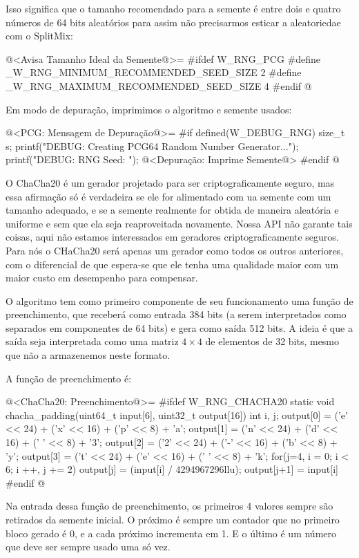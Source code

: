Isso significa que o tamanho recomendado para a semente é entre dois e
quatro números de 64 bits aleatórios para assim não precisarmos
esticar a aleatoriedae com o SplitMix:

\iniciocodigo
@<Avisa Tamanho Ideal da Semente@>=
#ifdef W_RNG_PCG
#define _W_RNG_MINIMUM_RECOMMENDED_SEED_SIZE  2
#define _W_RNG_MAXIMUM_RECOMMENDED_SEED_SIZE  4
#endif
@
\fimcodigo

Em modo de depuração, imprimimos o algoritmo e semente usados:

\iniciocodigo
@<PCG: Mensagem de Depuração@>=
#if defined(W_DEBUG_RNG)
{
  size_t s;
  printf("DEBUG: Creating PCG64 Random Number Generator...");
  printf("DEBUG: RNG Seed: ");
  @<Depuração: Imprime Semente@>
}
#endif
@
\fimcodigo



O ChaCha20 é um gerador projetado para ser criptograficamente seguro,
mas essa afirmação só é verdadeira se ele for alimentado com ua
semente com um tamanho adequado, e se a semente realmente for obtida
de maneira aleatória e uniforme e sem que ela seja reaproveitada
novamente. Nossa API não garante tais coisas, aqui não estamos
interessados em geradores criptograficamente seguros. Para nós o
CHaCha20 será apenas um gerador como todos os outros anteriores, com o
diferencial de que espera-se que ele tenha uma qualidade maior com um
maior custo em desempenho para compensar.

O algoritmo tem como primeiro componente de seu funcionamento uma
função de preenchimento, que receberá como entrada 384 bits (a serem
interpretados como separados em componentes de 64 bits) e gera como
saída 512 bits. A ideia é que a saída seja interpretada como uma
matriz $4\times 4$ de elementos de 32 bits, mesmo que não a
armazenemos neste formato.

A função de preenchimento é:

\iniciocodigo
@<ChaCha20: Preenchimento@>=
#ifdef W_RNG_CHACHA20
static void chacha_padding(uint64_t input[6], uint32_t output[16]){
  int i, j;
  output[0] = ('e' << 24) + ('x' << 16) + ('p' << 8) + 'a';
  output[1] = ('n' << 24) + ('d' << 16) + (' ' << 8) + '3';
  output[2] = ('2' << 24) + ('-' << 16) + ('b' << 8) + 'y';
  output[3] = ('t' << 24) + ('e' << 16) + (' ' << 8) + 'k';
  for(j=4, i = 0; i < 6; i ++, j += 2){
    output[j] = (input[i] / 4294967296llu);
    output[j+1] = input[i] %
  }
}
#endif
@
\fimcodigo

Na entrada dessa função de preenchimento, os primeiros 4 valores
sempre são retirados da semente inicial. O próximo é sempre um
contador que no primeiro bloco gerado é 0, e a cada próximo incrementa
em 1. E o último é um número que deve ser sempre usado uma só vez.


